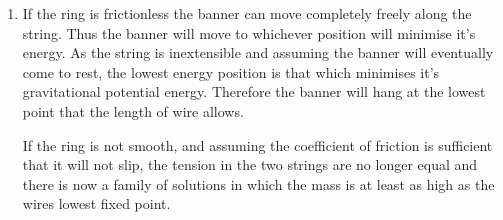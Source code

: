 \begin{problem}
{\begin{enumerate}
	 Thus the banner cannot hang above the level of the building, but what about at the same height. In this case the angle $\alpha$ would have to be 0, hence the wire horizontal. This would mean there was no vertical component of force on the banner from the wires and therefore nothing to support it's weight.
	  
	    \item If the ring is frictionless the banner can move completely freely along the string. Thus the banner will move to whichever position will minimise it's energy. As the string is inextensible and assuming the banner will eventually come to rest, the lowest energy position is that which minimises it's gravitational potential energy. Therefore the banner will hang at the lowest point that the length of wire allows.
	    
	    If the ring is not smooth, and assuming the coefficient of friction is sufficient that it will not slip, the tension in the two strings are no longer equal and there is now a family of solutions in which the mass is at least as high as the wires lowest fixed point.

\end{enumerate}
}
\end{problem}